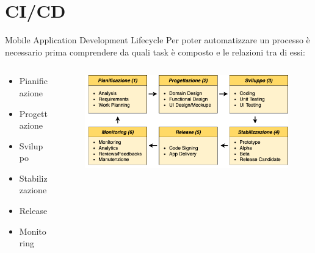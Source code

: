 
\section{CI/CD}
    \begin{frame}{Mobile Application Development Lifecycle}
        Per poter automatizzare un processo è necessario prima comprendere da quali task è composto e le relazioni tra di essi:
        \begin{columns}[onlytextwidth]
            \begin{column}{0.4\textwidth}
                \begin{itemize}
                    \item Pianificazione
                    \item Progettazione
                    \item Sviluppo
                    \item Stabilizzazione
                    \item Release
                    \item Monitoring
                \end{itemize}
            \end{column}
            \begin{column}{0.6\textwidth}
                \begin{figure}[H]
                    \centering
                    \includegraphics[width=1\textwidth]{img/tesi-2-Page-9.drawio.png}
                \end{figure}    
            \end{column}
       \end{columns}
    \end{frame}


